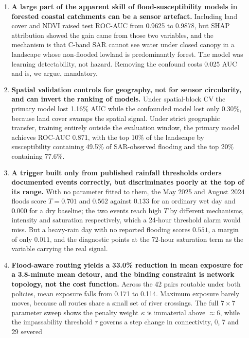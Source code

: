\documentclass[journal]{IEEEtran}
\begin{document}
\begin{enumerate}
\itemsep3pt
\item \textbf{A large part of the apparent skill of flood-susceptibility models
      in forested coastal catchments can be a sensor artefact.} Including land
      cover and NDVI raised test ROC-AUC from 0.9625 to 0.9878, but SHAP
      attribution showed the gain came from those two variables, and the
      mechanism is that C-band SAR cannot see water under closed canopy in a
      landscape whose non-flooded lowland is predominantly forest. The model was
      learning detectability, not hazard. Removing the confound costs 0.025 AUC
      and is, we argue, mandatory.
\item \textbf{Spatial validation controls for geography, not for sensor
      circularity, and can invert the ranking of models.} Under spatial-block CV
      the primary model lost 1.16\% AUC while the confounded model lost only
      0.30\%, because land cover swamps the spatial signal. Under strict
      geographic transfer, training entirely outside the evaluation window, the
      primary model achieves ROC-AUC 0.871, with the top 10\% of the landscape by
      susceptibility containing 49.5\% of SAR-observed flooding and the top 20\%
      containing 77.6\%.
\item \textbf{A trigger built only from published rainfall thresholds orders
      documented events correctly, but discriminates poorly at the top of its
      range.} With no parameter fitted to them, the May 2025 and August 2024
      floods score $T=0.701$ and $0.562$ against $0.133$ for an ordinary wet day
      and $0.000$ for a dry baseline; the two events reach high $T$ by different
      mechanisms, intensity and saturation respectively, which a 24-hour
      threshold alarm would miss. But a heavy-rain day with no reported flooding
      scores $0.551$, a margin of only $0.011$, and the diagnostic points at the
      72-hour saturation term as the variable carrying the real signal.
\item \textbf{Flood-aware routing yields a 33.0\% reduction in mean exposure for a
      3.8-minute mean detour, and the binding constraint is network topology, not
      the cost function.} Across the 42 pairs routable under both policies,
      mean exposure falls from 0.171 to 0.114. Maximum exposure barely moves, because all routes share a small set
      of river crossings. The full $7\times7$ parameter sweep shows the penalty
      weight $\kappa$ is immaterial above $\approx6$, while the impassability
      threshold $\tau$ governs a step change in connectivity, 0, 7 and 29 severed

\end{enumerate}
\end{document}
